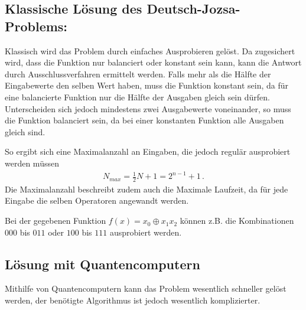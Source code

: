 \documentclass[10pt,aps,prb,twocolumn, nofootinbib]{revtex4-2}
\begin{document}
\subsection{Klassische L\"osung des Deutsch-Jozsa-Problems:}
Klassisch wird das Problem durch einfaches Ausprobieren gel\"ost. Da zugesichert wird, dass die Funktion
nur balanciert oder konstant sein kann, kann die Antwort durch Ausschlussverfahren ermittelt werden.
Falls mehr als die H\"alfte der Eingabewerte den selben Wert haben, muss die Funktion konstant sein,
da f\"ur eine balancierte Funktion nur die H\"alfte der Ausgaben gleich sein d\"urfen.
Unterscheiden sich jedoch mindestens zwei Ausgabewerte voneinander, so muss die Funktion balanciert sein,
da bei einer konstanten Funktion alle Ausgaben gleich sind.

So ergibt sich eine Maximalanzahl an Eingaben, die jedoch regul\"ar ausprobiert werden m\"ussen
\begin{align*}
    N_{max} = \frac{1}{2}N+1 = 2^{n-1} + 1\,.
\end{align*}
Die Maximalanzahl beschreibt zudem auch die Maximale Laufzeit, da f\"ur jede Eingabe die selben
Operatoren angewandt werden.

Bei der gegebenen Funktion $f(x)=x_0 \oplus x_1 x_2$ k\"onnen z.B. die Kombinationen $000$ bis $011$ oder
$100$ bis $111$ ausprobiert werden.

\subsection{L\"osung mit Quantencomputern}
Mithilfe von Quantencomputern kann das Problem wesentlich schneller gel\"ost werden, der ben\"otigte
Algorithmus ist jedoch wesentlich komplizierter.
\end{document}
